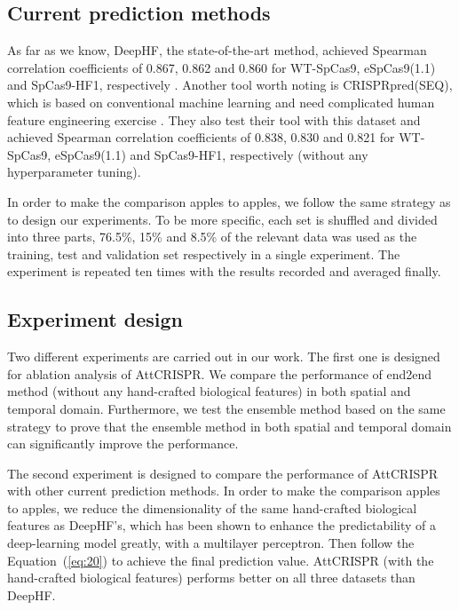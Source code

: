\documentclass{bioinfo}
\begin{document}
\subsection{Current prediction methods}

As far as we know, DeepHF, the state-of-the-art method, 
achieved Spearman correlation coefficients of 0.867, 0.862 and 0.860 for WT-SpCas9, eSpCas9(1.1) and SpCas9-HF1, respectively \citep{wang2019optimized}. 
Another tool worth noting is CRISPRpred(SEQ), which is based on conventional machine learning and need complicated human feature engineering exercise \citep{MuhammadRafid2020}. 
They also test their tool with this dataset and achieved Spearman correlation coefficients of 0.838, 0.830 and 0.821 for WT-SpCas9, eSpCas9(1.1) and SpCas9-HF1, respectively (without any hyperparameter tuning).

In order to make the comparison apples to apples, we follow the same strategy as \citeauthor{wang2019optimized} to design our experiments.
To be more specific, each set is shuffled and divided into three parts, 76.5\%, 15\% and 8.5\% of the relevant data was used as the training, test and validation set respectively in a single experiment. 
The experiment is repeated ten times with the results recorded and averaged finally.

\subsection{Experiment design}

Two different experiments are carried out in our work. 
The first one is designed for ablation analysis of AttCRISPR. 
We compare the performance of end2end method (without any hand-crafted biological features) in both spatial and temporal domain. 
Furthermore, we test the ensemble method based on the same strategy to prove that the ensemble method in both spatial and temporal domain can significantly improve the performance. 

The second experiment is designed to compare the performance of AttCRISPR with other current prediction methods. 
In order to make the comparison apples to apples, we reduce the dimensionality of the same hand-crafted biological features as DeepHF's, 
which has been shown to enhance the predictability of a deep-learning model greatly, with a multilayer perceptron. 
Then follow the Equation~(\ref{eq:20}) to achieve the final prediction value. 
AttCRISPR (with the hand-crafted biological features) performs better on all three datasets than DeepHF. 
\end{document}
